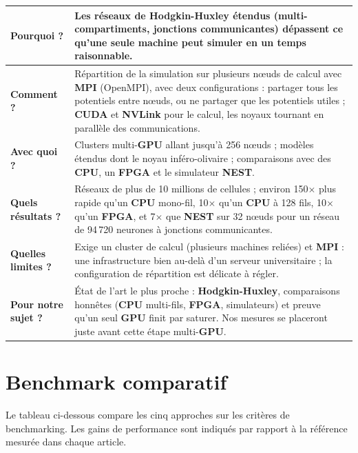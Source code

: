 \medskip
\begin{tabular}{|p{3.2cm}|p{11.2cm}|}
\hline
\textbf{Pourquoi ?} & Les réseaux de \textbf{Hodgkin-Huxley} étendus (multi-compartiments, jonctions communicantes) dépassent ce qu'une seule machine peut simuler en un temps raisonnable. \\ \hline
\textbf{Comment ?} & Répartition de la simulation sur plusieurs nœuds de calcul avec \textbf{MPI} (OpenMPI), avec deux configurations : partager tous les potentiels entre nœuds, ou ne partager que les potentiels utiles ; \textbf{CUDA} et \textbf{NVLink} pour le calcul, les noyaux tournant en parallèle des communications. \\ \hline
\textbf{Avec quoi ?} & Clusters multi-\textbf{GPU} allant jusqu'à 256 nœuds ; modèles étendus dont le noyau inféro-olivaire ; comparaisons avec des \textbf{CPU}, un \textbf{FPGA} et le simulateur \textbf{NEST}. \\ \hline
\textbf{Quels résultats ?} & Réseaux de plus de 10 millions de cellules ; environ 150$\times$ plus rapide qu'un \textbf{CPU} mono-fil, 10$\times$ qu'un \textbf{CPU} à 128 fils, 10$\times$ qu'un \textbf{FPGA}, et 7$\times$ que \textbf{NEST} sur 32 nœuds pour un réseau de 94\,720 neurones à jonctions communicantes. \\ \hline
\textbf{Quelles limites ?} & Exige un cluster de calcul (plusieurs machines reliées) et \textbf{MPI} : une infrastructure bien au-delà d'un serveur universitaire ; la configuration de répartition est délicate à régler. \\ \hline
\textbf{Pour notre sujet ?} & État de l'art le plus proche : \textbf{Hodgkin-Huxley}, comparaisons honnêtes (\textbf{CPU} multi-fils, \textbf{FPGA}, simulateurs) et preuve qu'un seul \textbf{GPU} finit par saturer. Nos mesures se placeront juste avant cette étape multi-\textbf{GPU}. \\ \hline
\end{tabular}

\chapter{Benchmark comparatif}
\label{chap:l3-bench}

Le tableau ci-dessous compare les cinq approches sur les critères de benchmarking. Les gains de performance sont indiqués par rapport à la référence mesurée dans chaque article.

\medskip

